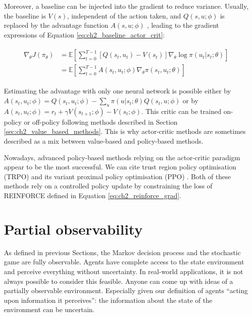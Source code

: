 Moreover, a baseline can be injected into the gradient to reduce variance.
Usually, the baseline is  $V(s)$, independent of the action taken, and $Q(s, u;\phi)$ is replaced by the advantage function $A(s,u; \phi)$ \citep{10.5555/2074022.2074088}, leading to the gradient expressions of Equation \ref{eq:ch2_baseline_actor_crit}:

\begin{align}
\begin{split}
\label{eq:ch2_baseline_actor_crit}
    \nabla_\theta J(\pi_\theta)
    & = \mathbb{E}\left[\sum_{t=0}^{T-1} [Q(s_t, u_t) - V(s_t)] \nabla_\theta \log \pi(u_t|s_t;\theta)\right]\\
    & = \mathbb{E} \left[\sum_{t=0}^{T-1} A(s_t, u_t; \phi) \nabla_\theta \pi(s_t, u_t; \theta)\right]
\end{split}
\end{align}

Estimating the advantage with only one neural network is possible either by $A(s_t,u_t; \phi)=Q(s_t, u_t;\phi)-\sum_u \pi(u|s_t;\theta) Q(s_t,u; \phi)$ or by $A(s_t,u_t; \phi)=r_t +\gamma V(s_{t+1};\phi) - V(s_t;\phi)$.
This critic can be trained on-policy or off-policy following methods described in Section \ref{sec:ch2_value_based_methods}.
This is why actor-critic methods are sometimes described as a mix between value-based and policy-based methods.

Nowadays, advanced policy-based methods relying on the actor-critic paradigm appear to be the most successful.
We can cite trust region policy optimisation (TRPO) \citep{schulman2015trust} and its variant proximal policy optimisation (PPO) \citep{schulman2017ppo}.
Both of these methods rely on a controlled policy update by constraining the loss of REINFORCE defined in Equation \ref{eq:ch2_reinforce_grad}.

\section{Partial observability} \label{sec:ch2_partial_observability}
As defined in previous Sections, the Markov decision process and the stochastic game are fully observable.
Agents have complete access to the state environment and perceive everything without uncertainty.
In real-world applications, it is not always possible to consider this feasible.
Anyone can come up with ideas of a partially observable environment.
Especially given our definition of agents ``acting upon information it perceives'': the information about the state of the environment can be uncertain.

